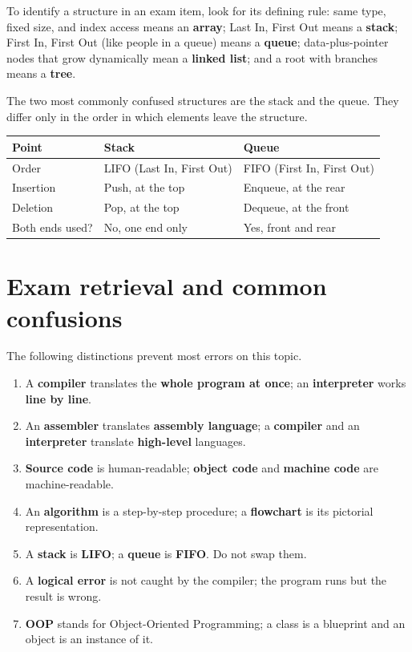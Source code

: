 To identify a structure in an exam item, look for its defining rule: same type,
fixed size, and index access means an \textbf{array}; Last In, First Out means
a \textbf{stack}; First In, First Out (like people in a queue) means a
\textbf{queue}; data-plus-pointer nodes that grow dynamically mean a
\textbf{linked list}; and a root with branches means a \textbf{tree}.

The two most commonly confused structures are the stack and the queue. They
differ only in the order in which elements leave the structure.

\begin{center}
\begin{tabular}{p{}p{}p{}}
\toprule
\textbf{Point} & \textbf{Stack} & \textbf{Queue} \\
\midrule
Order & LIFO (Last In, First Out) & FIFO (First In, First Out) \\
Insertion & Push, at the top & Enqueue, at the rear \\
Deletion & Pop, at the top & Dequeue, at the front \\
Both ends used? & No, one end only & Yes, front and rear \\
\bottomrule
\end{tabular}
\end{center}

\section{Exam retrieval and common confusions}
The following distinctions prevent most errors on this topic.
\begin{enumerate}
  \item A \textbf{compiler} translates the \textbf{whole program at once}; an
    \textbf{interpreter} works \textbf{line by line}.
  \item An \textbf{assembler} translates \textbf{assembly language}; a
    \textbf{compiler} and an \textbf{interpreter} translate
    \textbf{high-level} languages.
  \item \textbf{Source code} is human-readable; \textbf{object code} and
    \textbf{machine code} are machine-readable.
  \item An \textbf{algorithm} is a step-by-step procedure; a
    \textbf{flowchart} is its pictorial representation.
  \item A \textbf{stack} is \textbf{LIFO}; a \textbf{queue} is
    \textbf{FIFO}. Do not swap them.
  \item A \textbf{logical error} is not caught by the compiler; the program
    runs but the result is wrong.
  \item \textbf{OOP} stands for Object-Oriented Programming; a class is a
    blueprint and an object is an instance of it.
\end{enumerate}

